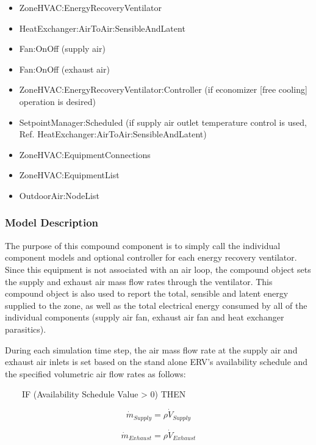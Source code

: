 \begin{itemize}
\item
  ZoneHVAC:EnergyRecoveryVentilator
\item
  HeatExchanger:AirToAir:SensibleAndLatent
\item
  Fan:OnOff (supply air)
\item
  Fan:OnOff (exhaust air)
\item
  ZoneHVAC:EnergyRecoveryVentilator:Controller (if economizer {[}free cooling{]} operation is desired)
\item
  SetpointManager:Scheduled (if supply air outlet temperature control is used, Ref. HeatExchanger:AirToAir:SensibleAndLatent)
\item
  ZoneHVAC:EquipmentConnections
\item
  ZoneHVAC:EquipmentList
\item
  OutdoorAir:NodeList
\end{itemize}

\subsubsection{Model Description}\label{model-description-3-004}

The purpose of this compound component is to simply call the individual component models and optional controller for each energy recovery ventilator. Since this equipment is not associated with an air loop, the compound object sets the supply and exhaust air mass flow rates through the ventilator. This compound object is also used to report the total, sensible and latent energy supplied to the zone, as well as the total electrical energy consumed by all of the individual components (supply air fan, exhaust air fan and heat exchanger parasitics).

During each simulation time step, the air mass flow rate at the supply air and exhaust air inlets is set based on the stand alone ERV's availability schedule and the specified volumetric air flow rates as follows:

~~~~IF (Availability Schedule Value \textgreater{} 0) THEN

\begin{equation}
\dot{m}_{Supply} = \rho \dot{V}_{Supply}
\end{equation}

\begin{equation}
\dot{m}_{Exhaust} = \rho \dot{V}_{Exhaust}
\end{equation}

